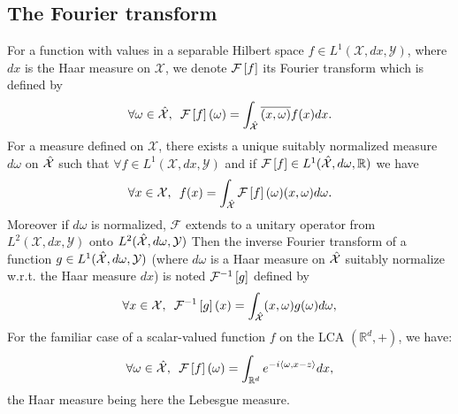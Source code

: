 \subsection{The Fourier transform}
For a function with values in a separable Hilbert space $f\in L^1(\mathcal{X},dx,\mathcal{Y})$, where $dx$ is the Haar measure on $\mathcal{X}$, we denote $\mathcal{F}\left[f\right]$ its Fourier transform which is defined by
\begin{equation*}
    \forall \omega \in \hat{\mathcal{X}},\enskip \mathcal{F}\left[f\right](\omega)=\int_{\hat{\mathcal{X}}} \overline{(x,\omega)}f(x)dx.
\end{equation*} 
For a measure defined on $\mathcal{X}$, there exists a unique suitably normalized measure $d\omega$ on $\hat{\mathcal{X}}$ such that $\forall f \in L^1(\mathcal{X}, dx, \mathcal{Y})$ and if $\mathcal{F}\left[f\right] \in L^1(\hat{\mathcal{X}}, d\omega, \mathbb{R})$ we have
 \begin{equation}\label{fourier-l1}
 \forall x \in \mathcal{X},\enskip f(x)=\int_{\hat{\mathcal{X}}}\mathcal{F}\left[f\right](\omega)(x,\omega) d\omega.
\end{equation}
Moreover if $d\omega$ is normalized, $\mathcal{F}$ extends to a unitary operator from $L^2(\mathcal{X}, dx, \mathcal{Y})$ onto $L^2(\hat{\mathcal{X}}, d\omega, \mathcal{Y})$ Then the inverse Fourier transform of a function $g\in L^1(\hat{\mathcal{X}},d\omega,\mathcal{Y})$ (where $d\omega$ is a Haar measure on $\hat{\mathcal{X}}$ suitably normalize w.r.t. the Haar measure $dx$) is noted $\mathcal{F}^{-1}\left[g\right]$ defined by
\begin{equation*}
    \forall x \in \mathcal{X},\enskip \mathcal{F}^{-1}\left[g\right](x) = \int_{\hat{\mathcal{X}}} (x,\omega)g(\omega) d\omega,
\end{equation*}
 For the familiar case of a scalar-valued function $f$ on the LCA $(\mathbb{R}^d, +)$, we have: 
 \begin{equation}\label{fourier-R-plus}
 \forall \omega \in \hat{\mathcal{X}},\enskip \mathcal{F}\left[f\right](\omega)=\int_{\mathbb{R}^d} e^{-i \langle\omega,x - z\rangle} dx,
\end{equation}
the Haar measure being here the Lebesgue measure.